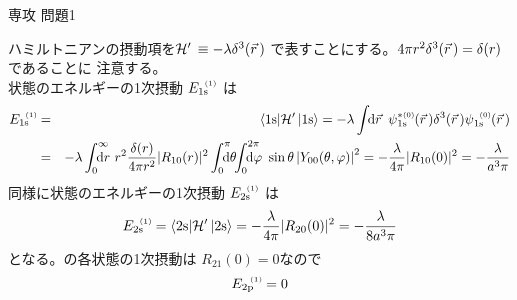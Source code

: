 \documentclass[fleqn]{jbook}
\begin{document}
\begin{answer}{専攻 問題1}{}
\begin{subanswers}
\SubAnswer
  \begin{subsubanswers}
  \SubSubAnswer
    ハミルトニアンの摂動項を${\cal H}^\prime\,\equiv -\lambda\delta^3(\vec{r}\,)$
    で表すことにする。$4\pi r^2\delta^3(\vec{r}\,)=\delta(r)$であることに
    注意する。\\
%
    状態のエネルギーの1次摂動 $E_{\Orbit{1s}}\fpar$ は
%
    \begin{eqnarray*}
      E_{\Orbit{1s}}\fpar%
        &=&  \Bracket{\Orbit{1s}}\HI{\Orbit{1s}}%
         =  -\lambda\Uint{\d{\vr}}%
             \WFHC{\Orbit{1s}}\zpar(\vr)%
             \delta^3(\vr)%
             \WF{\Orbit{1s}}\zpar(\vr)\\
        &=& -\lambda\Dint{0}{\infty}{\d{r}}%
             r^2\frac{\delta(r)}{4\pi r^2}|R_{10}(r)|^2%
             \Dint{0}{\pi}{\d{\theta}}\bquad%
             \Dint{0}{2\pi}{\d{\varphi}}\sin\theta
             \left|Y_{00}(\theta,\varphi)\right|^2%
         =  -\frac{\lambda}{4\pi} |R_{10}(0)|^2%
         =  -\frac{\lambda}{a^3\pi}
    \end{eqnarray*}
%
    同様に状態のエネルギーの1次摂動
    $E_{\Orbit{2s}}\fpar$ は
%
    \[ E_{\Orbit{2s}}\fpar%
       =  \Bracket{\Orbit{2s}}\HI{\Orbit{2s}}%
       =  -\frac{\lambda}{4\pi} |R_{20}(0)|^2%
       =  -\frac{\lambda}{8a^3\pi} \]
%
    となる。の各状態の1次摂動は $R_{21}(0)=0$なので
%
    \[ E_{\Orbit{2p}}\fpar = 0 \]
%


\end{subsubanswers}
\end{subanswers}
\end{answer}
\end{document}
